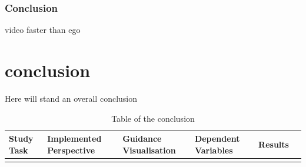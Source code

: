 \subsubsection{Conclusion}
video faster than ego







\section{conclusion}
Here will stand an overall conclusion
\begin{table}[H]
	\begin{tabular}{|l|l|l|l|l|l|}
		\hline
		Study Task & Implemented Perspective & Guidance Visualisation & Dependent Variables & Results & \\ \hline
		&  &  &  &  & \\ \hline
	\end{tabular}
	\caption{Table of the conclusion}
\end{table}


